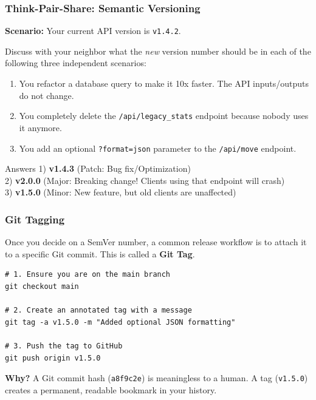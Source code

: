 \documentclass[xcolor=table]{beamer}
\begin{document}
\begin{frame}
    \frametitle{Think-Pair-Share: Semantic Versioning}
    \textbf{Scenario:} Your current API version is \texttt{v1.4.2}. 
    
    \vspace{0.2cm}
    Discuss with your neighbor what the \textit{new} version number should be in each of the following three independent scenarios:
    
    \begin{enumerate}
        \item You refactor a database query to make it 10x faster. The API inputs/outputs do not change.
        \item You completely delete the \texttt{/api/legacy\_stats} endpoint because nobody uses it anymore.
        \item You add an optional \texttt{?format=json} parameter to the \texttt{/api/move} endpoint.
    \end{enumerate}
    
    \pause
    \vspace{0.2cm}
    \begin{alertblock}{Answers}
        1) \textbf{v1.4.3} (Patch: Bug fix/Optimization)\\
        2) \textbf{v2.0.0} (Major: Breaking change! Clients using that endpoint will crash)\\
        3) \textbf{v1.5.0} (Minor: New feature, but old clients are unaffected)
    \end{alertblock}
\end{frame}

\begin{frame}[fragile]
    \frametitle{Git Tagging}
    Once you decide on a SemVer number, a common release workflow is to attach it to a specific Git commit. This is called a \textbf{Git Tag}.
    
    \begin{verbatim}
# 1. Ensure you are on the main branch
git checkout main

# 2. Create an annotated tag with a message
git tag -a v1.5.0 -m "Added optional JSON formatting"

# 3. Push the tag to GitHub
git push origin v1.5.0
    \end{verbatim}

    \vspace{0.2cm}
    \textbf{Why?} A Git commit hash (\texttt{a8f9c2e}) is meaningless to a human. A tag (\texttt{v1.5.0}) creates a permanent, readable bookmark in your history.
\end{frame}
\end{document}
